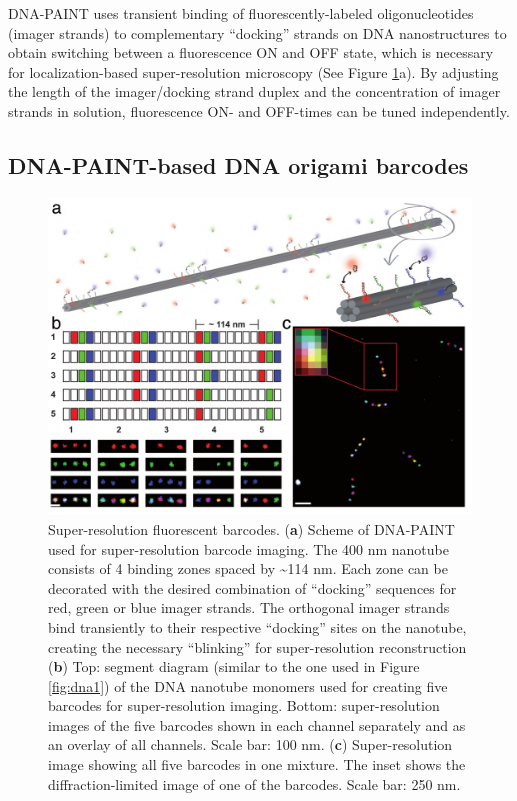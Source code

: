 DNA-PAINT uses transient binding of fluorescently-labeled oligonucleotides 
(imager strands) to complementary “docking” strands on DNA nanostructures to obtain 
switching between a fluorescence ON and OFF state, which is necessary for 
localization-based super-resolution microscopy (See Figure \ref{fig:dna4}a). By adjusting the length of 
the imager/docking strand duplex and the concentration of imager strands in solution, 
fluorescence ON- and OFF-times can be tuned independently.

\subsection{DNA-PAINT-based DNA origami barcodes}
\begin{figure} %
\includegraphics[width=\textwidth]{figures/dna4}
\caption[Super-resolution fluorescent barcodes.]{Super-resolution fluorescent barcodes.
 (\textbf{a}) Scheme of DNA-PAINT used for 
super-resolution barcode imaging. The 400 nm nanotube consists of 4 binding zones 
spaced by \textasciitilde114 nm. Each zone can be decorated with the desired combination of 
“docking” sequences for red, green or blue imager strands. The orthogonal imager strands 
bind transiently to their respective “docking” sites on the nanotube, creating the 
necessary “blinking” for super-resolution reconstruction (\textbf{b}) Top: segment diagram 
(similar to the one used in Figure \ref{fig:dna1}) of the DNA nanotube monomers used for creating 
five barcodes for super-resolution imaging. Bottom: super-resolution images of the five 
barcodes shown in each channel separately and as an overlay of all channels. Scale bar: 
100 nm. (\textbf{c}) Super-resolution image showing all five barcodes in one mixture. The inset 
shows the diffraction-limited image of one of the barcodes. Scale bar: 250 nm.
\label{fig:dna4}}
\end{figure}
\afterpage{\clearpage}


